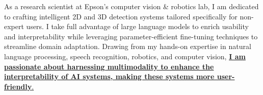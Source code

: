 \documentclass[10pt, letterpaper]{awesome-cv} %
\begin{document}
\makecvheader %

\begin{cvletter}
\vspace*{-0.05cm}
As a research scientist at Epson's computer vision \& robotics lab, I am dedicated to crafting intelligent 2D and 3D detection systems tailored specifically for non-expert users. I take full advantage of large language models to enrich usability and interpretability while leveraging parameter-efficient fine-tuning techniques to streamline domain adaptation. Drawing from my hands-on expertise in natural language processing, speech recognition, robotics, and computer vision, \href{https://github.com/ljj7975/ljj7975.github.io/tree/main/blog/research#what-is-my-interest}{\textbf{I am passionate about harnessing multimodality to enhance the interpretability of AI systems, making these systems more user-friendly}. {\small \faLink}}
\end{cvletter}







%
%
%

\end{document}
